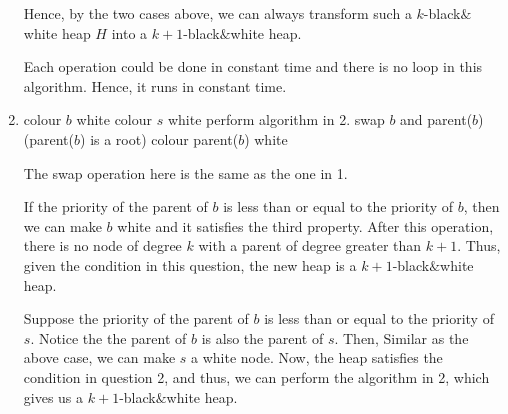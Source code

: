 \documentclass[10pt]{article}
\begin{document}
\begin{enumerate}
		Hence, by the two cases above, we can always transform such a
		$k$-black$\&$white heap $H$ into a $k+1$-black$\&$white heap.

		Each operation could be done in constant time and there is no loop in
		this algorithm.
		Hence, it runs in constant time.

	\item
	\begin{comment}
		Suppose you have a linked-list H of binomial trees that satisfies all
		the properties of a black$&$white heap except that it has one black node
		b od degree k and its parent has degree greater than $k+1$.
		Suppose that the sibling $s$ of degree $k+1$ of $b$ is black.
		Given pointers to $b$ and $s$, explain how to transform H in constant
		time into a k'-black$&$white heap with the some set of nodes, for some
		$k' > k$.
	\end{comment}

		\begin{algorithmic}[1]
				\State colour $b$ white
				\State colour $s$ white
				\State perform algorithm in 2.
			\Else
				\State swap $b$ and parent($b$)
				\If(parent($b$) is a root)
					\State colour parent($b$) white
				\EndIf
			\EndIf
		\end{algorithmic}

		The swap operation here is the same as the one in 1.

		If the priority of the parent of $b$ is less than or equal to the
		priority of $b$, then we can make $b$ white and it satisfies the third
		property.
		After this operation, there is no node of degree $k$ with a parent of
		degree greater than $k+1$.
		Thus, given the condition in this question, the new heap is a
		$k+1$-black$\&$white heap. 

		Suppose the priority of the parent of $b$ is less than or equal to the
		priority of $s$.
		Notice the the parent of $b$ is also the parent of $s$.
		Then, Similar as the above case, we can make $s$ a white node. 
		Now, the heap satisfies the condition in question 2, and thus, we can
		perform the algorithm in 2, which gives us a $k+1$-black$\&$white heap.


\end{enumerate}
\end{document}
